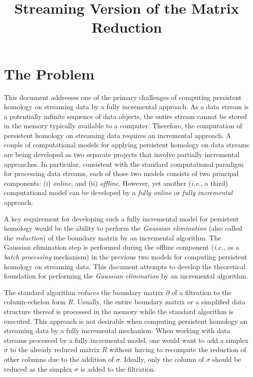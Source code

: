 \documentclass[11pt]{article}
\begin{document}
\title{Streaming Version of the Matrix Reduction}

\maketitle

\section{The Problem}

This document addresses one of the primary challenges of computing persistent homology on streaming 
data by a fully incremental approach.  As a data stream is a potentially infinite sequence of data 
objects, the entire stream cannot be stored in the memory typically available to a computer.  
Therefore, the computation of persistent homology on streaming data requires an incremental 
approach.  A couple of computational models for applying persistent homology on data streams are 
being developed as two separate projects that involve partially incremental approaches.  In 
particular, consistent with the standard computational paradigm \cite{silva-13} for processing 
data streams, each of those two models consists of two principal components: (i) \emph{online}, and 
(ii) \emph{offline}.  However, yet another (\emph{i.e.}, a third) computational model can be 
developed by a \emph{fully online} or \emph{fully incremental} approach.


A key requirement for developing such a fully incremental model for persistent homology would be 
the ability to perform the \emph{Gaussian elimination} (also called the \emph{reduction}) of the 
boundary matrix \cite{edelsbrunner-00, zomorodian-05} by an incremental algorithm.  The Gaussian 
elimination step is performed during the offline component (\emph{i.e.}, as a \emph{batch 
processing} mechanism) in the previous two models for computing persistent homology on streaming 
data.  This document attempts to develop the theoretical foundation for performing the 
\emph{Gaussian elimination} by an incremental algorithm.


The standard algorithm \cite{edelsbrunner-00, zomorodian-05} \emph{reduces} the boundary matrix 
$\partial$ of a filtration \cite{zomorodian-10} to the column-echelon form $R$.  Usually, the 
entire boundary matrix or a simplified data structure thereof is processed in the memory while the 
standard algorithm is executed.  This approach is not desirable when computing persistent homology 
on streaming data by a fully incremental mechanism.  When working with data streams processed by a 
fully incremental model, one would want to add a simplex $\sigma$ to the already reduced matrix $R$ 
without having to recompute the reduction of other columns due to the addition of $\sigma$.  
Ideally, only the column of $\sigma$ should be reduced as the simplex $\sigma$ is added to the 
filtration.
\end{document}

